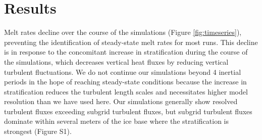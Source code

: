 \documentclass[draft]{agujournal2019}
\begin{document}



\section{Results}\label{results}

Melt rates decline over the course of the simulations (Figure \ref{fig:timeseries}), preventing the identification of steady-state melt rates for most runs. This decline is in response to the concomitant increase in stratification during the course of the simulations, which decreases vertical heat fluxes by reducing vertical turbulent fluctuations. We do not continue our simulations beyond 4 inertial periods in the hope of reaching steady-state conditions because the increase in stratification reduces the turbulent length scales and necessitates higher model resolution than we have used here. Our simulations generally show resolved turbulent fluxes exceeding subgrid turbulent fluxes, but subgrid turbulent fluxes dominate within several meters of the ice base where the stratification is strongest (Figure S1).
\end{document}
